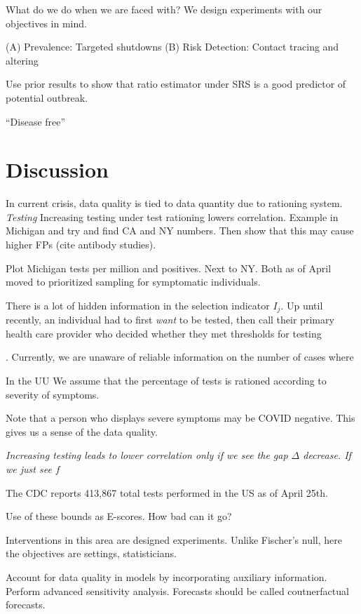 \documentclass[11pt]{amsart}
\begin{document}
What do we do when we are faced with?  We design experiments with our objectives in mind.

(A) Prevalence: Targeted shutdowns
(B) Risk Detection: Contact tracing and altering

Use prior results to show that ratio estimator under SRS is a good predictor of potential outbreak.

``Disease free''


\section{Discussion}

In current crisis, data quality is tied to data quantity due to rationing system. \emph{Testing }
Increasing testing under test rationing lowers correlation.  Example in Michigan and try and find CA and NY numbers.  Then show that this may cause higher FPs (cite antibody studies).

Plot Michigan tests per million and positives.  Next to NY.  Both as of April moved to prioritized sampling for symptomatic individuals.

There is a lot of hidden information in the selection indicator $I_j$.  Up until recently, an individual had to first \emph{want} to be tested, then call their primary health care provider who decided whether they met thresholds for testing

. Currently, we are unaware of reliable information on the number of cases where

In the UU
We assume that the percentage of tests is rationed according to severity of symptoms.

Note that a person who displays severe symptoms may be COVID negative.  This gives us a sense of the data quality.

\emph{Increasing testing leads to lower correlation only if we see the gap $\Delta$ decrease.  If we just see $f$ }

The CDC reports 413,867 total tests performed in the US as of April 25th.




Use of these bounds as E-scores.  How bad can it go?

Interventions in this area are designed experiments.  Unlike Fischer's null, here the objectives are settings, statisticians.

Account for data quality in models by incorporating auxiliary information.  Perform advanced sensitivity analysis.  Forecasts should be called coutnerfactual forecasts.
\end{document}
